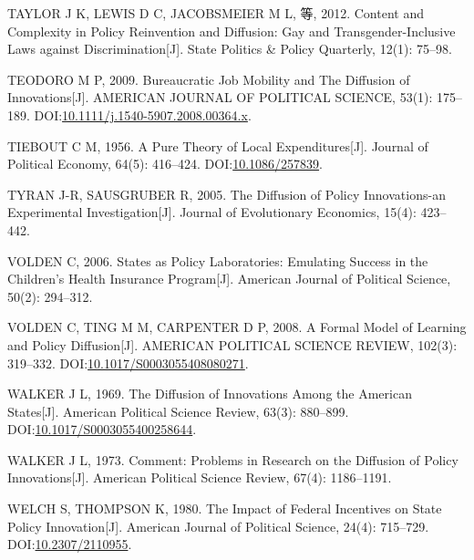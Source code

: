 \documentclass[
  12pt,
]{ctexart}
\newlength{\cslhangindent}
\newlength{\cslentryspacingunit} %
\newenvironment{CSLReferences}[2] %
 {%
  \setlength{\parindent}{0pt}
  \ifodd #1
  \let\oldpar\par
  \def\par{\hangindent=\cslhangindent\oldpar}
  \fi
  \setlength{\parskip}{#2\cslentryspacingunit}
 }%
 {}
\begin{document}
\begin{CSLReferences}{1}{0}
\leavevmode{}%
TAYLOR J K, LEWIS D C, JACOBSMEIER M L, 等, 2012. Content and Complexity in Policy Reinvention and Diffusion: {Gay} and Transgender-Inclusive Laws against Discrimination{[}J{]}. State Politics \& Policy Quarterly, 12(1): 75--98.

\leavevmode{}%
TEODORO M P, 2009. Bureaucratic {Job Mobility} and {The Diffusion} of {Innovations}{[}J{]}. AMERICAN JOURNAL OF POLITICAL SCIENCE, 53(1): 175--189. DOI:\href{https://doi.org/10.1111/j.1540-5907.2008.00364.x}{10.1111/j.1540-5907.2008.00364.x}.

\leavevmode{}%
TIEBOUT C M, 1956. A {Pure Theory} of {Local Expenditures}{[}J{]}. Journal of Political Economy, 64(5): 416--424. DOI:\href{https://doi.org/10.1086/257839}{10.1086/257839}.

\leavevmode{}%
TYRAN J-R, SAUSGRUBER R, 2005. The Diffusion of Policy Innovations-an Experimental Investigation{[}J{]}. Journal of Evolutionary Economics, 15(4): 423--442.

\leavevmode{}%
VOLDEN C, 2006. States as {Policy Laboratories}: {Emulating Success} in the {Children}'s {Health Insurance Program}{[}J{]}. American Journal of Political Science, 50(2): 294--312.

\leavevmode{}%
VOLDEN C, TING M M, CARPENTER D P, 2008. A Formal Model of Learning and Policy Diffusion{[}J{]}. AMERICAN POLITICAL SCIENCE REVIEW, 102(3): 319--332. DOI:\href{https://doi.org/10.1017/S0003055408080271}{10.1017/S0003055408080271}.

\leavevmode{}%
WALKER J L, 1969. The {Diffusion} of {Innovations} Among the {American States}{[}J{]}. American Political Science Review, 63(3): 880--899. DOI:\href{https://doi.org/10.1017/S0003055400258644}{10.1017/S0003055400258644}.

\leavevmode{}%
WALKER J L, 1973. Comment: {Problems} in Research on the Diffusion of Policy Innovations{[}J{]}. American Political Science Review, 67(4): 1186--1191.

\leavevmode{}%
WELCH S, THOMPSON K, 1980. The {Impact} of {Federal Incentives} on {State Policy Innovation}{[}J{]}. American Journal of Political Science, 24(4): 715--729. DOI:\href{https://doi.org/10.2307/2110955}{10.2307/2110955}.


\end{CSLReferences}
\end{document}
